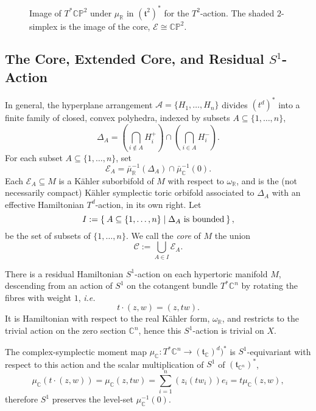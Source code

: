 \documentclass{amsart}
\newcommand{\ie}{\emph{i.e.} }
\newcommand{\ra}{\rightarrow}
\newcommand{\w}{\omega}
\newcommand{\PP}{\mathbb{P}}
\newcommand{\RR}{\mathbb{R}}
\newcommand{\CC}{\mathbb{C}}
\newcommand{\mcA}{\mathcal{A}}
\newcommand{\mcC}{\mathcal{C}}
\newcommand{\mcE}{\mathcal{E}}
\newcommand{\mft}{\mathfrak{t}}
\begin{document}
	\begin{figure}[h!]
		\centering
		\caption{Image of $T^{\ast}\CC\PP^{2}$ under $\mu_{\RR}$ in $(\mft^{2})^{\ast}$ for the $T^{2}$-action. The shaded $2$-simplex is the image of the core, $\mcE \cong \CC\PP^{2}$.} \label{fig:TCP2-moment-image}
	\end{figure}
		
	\subsection{The Core, Extended Core, and Residual $S^{1}$-Action}
	
	In general, the hyperplane arrangement $\mcA = \{H_{1}, \ldots, H_{n} \}$ divides $(t^{d})^{\ast}$ into a finite family of closed, convex polyhedra, indexed by subsets $A \subseteq \{1,\ldots, n\}$,
	\[
	\Delta_{A} = \left(\bigcap_{i \not\in A} H_{i}^{+} \right) \cap \left(\bigcap_{i \in A} H_{i}^{-} \right).
	\]
	For each subset $A \subseteq \{1, \ldots, n\}$, set
	\[
	\mcE_{A} = \bar{\mu}_{\RR}^{-1}(\Delta_{A})\cap \bar{\mu}_{\CC}^{-1}(0).
	\]
	Each $\mcE_{A} \subseteq M$ is a K\"ahler suborbifold of $M$ with respect to $\w_{\RR}$, and is the (not necessarily compact) K\"ahler symplectic toric orbifold associated to $\Delta_{A}$ with an effective Hamiltonian $T^{d}$-action, in its own right. Let
	\[
		I := \Set{A \subseteq \{1, \ldots, n\} | \Delta_{A} \text{ is bounded}},
	\]
	be the set of subsets of $\{1, \ldots, n\}$. We call the \emph{core} of $M$ the union
	\[
		\mcC := \bigcup_{A \in I} \mcE_{A}.
	\]
	
	There is a residual Hamiltonian $S^{1}$-action on each hypertoric manifold $M$, descending from an action of $S^{1}$ on the cotangent bundle $T^{\ast}\CC^{n}$ by rotating the fibres with weight $1$, \ie
	\[
		t\cdot (z,w) = (z,tw).
	\]
	It is Hamiltonian with respect to the real K\"ahler form, $\w_{\RR}$, and restricts to the trivial action on the zero section $\CC^{n}$, hence this $S^{1}$-action is trivial on $X$.
	
	The complex-symplectic moment map $\mu_{\CC} : T^{\ast}\CC^{n} \ra (\mft_{\CC})^{d})^{\ast}$ is $S^{1}$-equivariant with respect to this action and the scalar multiplication of $S^{1}$ of $(\mft_{\CC^{n}})^{\ast}$,
		\[
		\mu_{\CC}\left(t\cdot(z,w)\right) = \mu_{\CC}(z,tw) = \sum_{i=1}^{n}\left(z_{i}(tw_{i})\right)e_{i} = t\mu_{\CC}(z,w),
		\]
	therefore $S^{1}$ preserves the level-set $\mu_{\CC}^{-1}(0)$. 
	
\end{document}
